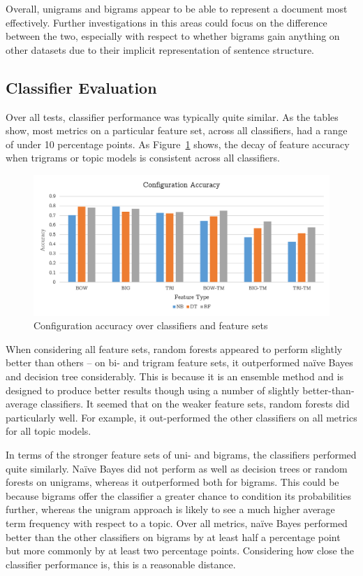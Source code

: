 \documentclass[11pt]{article}
\begin{document}
Overall, unigrams and bigrams appear to be able to represent a document most effectively. Further investigations in this areas could focus on the difference between the two, especially with respect to whether bigrams gain anything on other datasets due to their implicit representation of sentence structure.

\subsection{Classifier Evaluation}
Over all tests, classifier performance was typically quite similar. As the tables show, most metrics on a particular feature set, across all classifiers, had a range of under 10 percentage points. As Figure~\ref{chart} shows, the decay of feature accuracy when trigrams or topic models is consistent across all classifiers. 

\begin{figure}
\begin{center}
\includegraphics[scale=0.8]{chart}
\end{center}
\caption{Configuration accuracy over classifiers and feature sets}
\label{chart}
\end{figure}

When considering all feature sets, random forests appeared to perform slightly better than others – on bi- and trigram feature sets, it outperformed naïve Bayes and decision tree considerably. This is because it is an ensemble method and is designed to produce better results though using a number of slightly better-than-average classifiers. It seemed that on the weaker feature sets, random forests did particularly well. For example, it out-performed the other classifiers on all metrics for all topic models. 

In terms of the stronger feature sets of uni- and bigrams, the classifiers performed quite similarly. Na{\"i}ve Bayes did not perform as well as decision trees or random forests on unigrams, whereas it outperformed both for bigrams. This could be because bigrams offer the classifier a greater chance to condition its probabilities further, whereas the unigram approach is likely to see a much higher average term frequency with respect to a topic. Over all metrics, na{\"i}ve Bayes performed better than the other classifiers on bigrams by at least half a percentage point but more commonly by at least two percentage points. Considering how close the classifier performance is, this is a reasonable distance.
\end{document}
